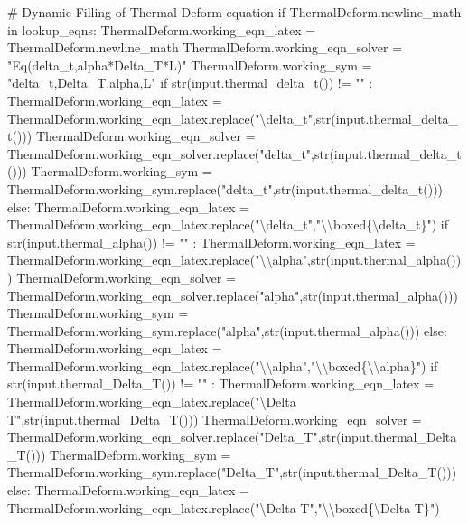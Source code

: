 \documentclass[
  letterpaper,
  DIV=11,
  numbers=noendperiod]{scrreprt}
\newenvironment{Shaded}{\begin{snugshade}}{\end{snugshade}}
\newcommand{\NormalTok}[1]{\textcolor[rgb]{0.00,0.23,0.31}{#1}}
\begin{document}
\begin{Shaded}
\begin{Highlighting}[]
\NormalTok{        \# Dynamic Filling of Thermal Deform equation }
\NormalTok{        if ThermalDeform.newline\_math in lookup\_eqns:}
\NormalTok{            ThermalDeform.working\_eqn\_latex = ThermalDeform.newline\_math}
\NormalTok{            ThermalDeform.working\_eqn\_solver = "Eq(delta\_t,alpha*Delta\_T*L)"}
\NormalTok{            ThermalDeform.working\_sym = "delta\_t,Delta\_T,alpha,L"}
\NormalTok{            if str(input.thermal\_delta\_t()) != "" : }
\NormalTok{                ThermalDeform.working\_eqn\_latex = ThermalDeform.working\_eqn\_latex.replace("\textbackslash{}delta\_t",str(input.thermal\_delta\_t()))}
\NormalTok{                ThermalDeform.working\_eqn\_solver = ThermalDeform.working\_eqn\_solver.replace("delta\_t",str(input.thermal\_delta\_t()))}
\NormalTok{                ThermalDeform.working\_sym = ThermalDeform.working\_sym.replace("delta\_t",str(input.thermal\_delta\_t()))}
\NormalTok{            else:}
\NormalTok{                ThermalDeform.working\_eqn\_latex = ThermalDeform.working\_eqn\_latex.replace("\textbackslash{}delta\_t","\textbackslash{}\textbackslash{}boxed\{\textbackslash{}delta\_t\}")}
\NormalTok{            if str(input.thermal\_alpha()) != "" : }
\NormalTok{                ThermalDeform.working\_eqn\_latex = ThermalDeform.working\_eqn\_latex.replace("\textbackslash{}\textbackslash{}alpha",str(input.thermal\_alpha()))}
\NormalTok{                ThermalDeform.working\_eqn\_solver = ThermalDeform.working\_eqn\_solver.replace("alpha",str(input.thermal\_alpha()))}
\NormalTok{                ThermalDeform.working\_sym = ThermalDeform.working\_sym.replace("alpha",str(input.thermal\_alpha()))}
\NormalTok{            else:}
\NormalTok{                ThermalDeform.working\_eqn\_latex = ThermalDeform.working\_eqn\_latex.replace("\textbackslash{}\textbackslash{}alpha","\textbackslash{}\textbackslash{}boxed\{\textbackslash{}\textbackslash{}alpha\}")}
\NormalTok{            if str(input.thermal\_Delta\_T()) != "" : }
\NormalTok{                ThermalDeform.working\_eqn\_latex = ThermalDeform.working\_eqn\_latex.replace("\textbackslash{}Delta T",str(input.thermal\_Delta\_T()))}
\NormalTok{                ThermalDeform.working\_eqn\_solver = ThermalDeform.working\_eqn\_solver.replace("Delta\_T",str(input.thermal\_Delta\_T()))}
\NormalTok{                ThermalDeform.working\_sym = ThermalDeform.working\_sym.replace("Delta\_T",str(input.thermal\_Delta\_T()))}
\NormalTok{            else:}
\NormalTok{                ThermalDeform.working\_eqn\_latex = ThermalDeform.working\_eqn\_latex.replace("\textbackslash{}Delta T","\textbackslash{}\textbackslash{}boxed\{\textbackslash{}Delta T\}")}

\end{Highlighting}
\end{Shaded}
\end{document}
